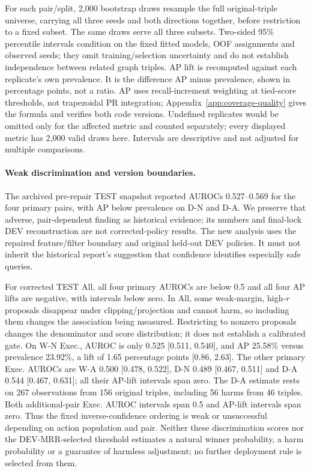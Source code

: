 \documentclass[11pt,a4paper]{article}
\begin{document}
For each pair/split, 2,000 bootstrap draws resample the full original-triple universe, carrying all three seeds and both directions together, before restriction to a fixed subset. The same draws serve all three subsets. Two-sided 95\% percentile intervals condition on the fixed fitted models, OOF assignments and observed seeds; they omit training/selection uncertainty and do not establish independence between related graph triples. AP lift is recomputed against each replicate's own prevalence. It is the difference AP minus prevalence, shown in percentage points, not a ratio. AP uses recall-increment weighting at tied-score thresholds, not trapezoidal PR integration; Appendix~\ref{app:coverage-quality} gives the formula and verifies both code versions. Undefined replicates would be omitted only for the affected metric and counted separately; every displayed metric has 2,000 valid draws here. Intervals are descriptive and not adjusted for multiple comparisons.



\FloatBarrier

\paragraph{Weak discrimination and version boundaries.}
The archived pre-repair TEST snapshot reported AUROCs 0.527--0.569 for the four primary pairs, with AP below prevalence on D-N and D-A. We preserve that adverse, pair-dependent finding as historical evidence; its numbers and final-lock DEV reconstruction are not corrected-policy results. The new analysis uses the repaired feature/filter boundary and original held-out DEV policies. It must not inherit the historical report's suggestion that confidence identifies especially safe queries.

For corrected TEST All, all four primary AUROCs are below 0.5 and all four AP lifts are negative, with intervals below zero. In All, some weak-margin, high-$r$ proposals disappear under clipping/projection and cannot harm, so including them changes the association being measured. Restricting to nonzero proposals changes the denominator and score distribution; it does not establish a calibrated gate. On W-N Exec., AUROC is only 0.525 [0.511, 0.540], and AP 25.58\% versus prevalence 23.92\%, a lift of 1.65 percentage points [0.86, 2.63]. The other primary Exec. AUROCs are W-A 0.500 [0.478, 0.522], D-N 0.489 [0.467, 0.511] and D-A 0.544 [0.467, 0.631]; all their AP-lift intervals span zero. The D-A estimate rests on 267 observations from 156 original triples, including 56 harms from 46 triples. Both additional-pair Exec. AUROC intervals span 0.5 and AP-lift intervals span zero. Thus the fixed inverse-confidence ordering is weak or unsuccessful depending on action population and pair. Neither these discrimination scores nor the DEV-MRR-selected threshold estimates a natural winner probability, a harm probability or a guarantee of harmless adjustment; no further deployment rule is selected from them.
\end{document}
